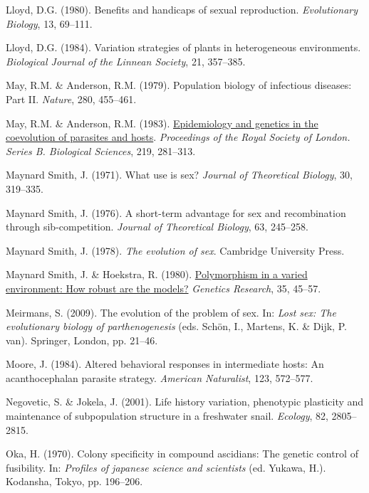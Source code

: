 \documentclass[
  letterpaper,
]{book}
\newlength{\cslhangindent}
\newenvironment{CSLReferences}[2] %
 {\begin{list}{}{%
  \setlength{\itemindent}{0pt}
  \setlength{\leftmargin}{0pt}
  \setlength{\parsep}{0pt}
  \ifodd #1
   \setlength{\leftmargin}{\cslhangindent}
   \setlength{\itemindent}{-1\cslhangindent}
  \fi
  \setlength{\itemsep}{#2\baselineskip}}}
 {\end{list}}
\begin{document}
\begin{CSLReferences}{1}{0}
Lloyd, D.G. (1980). Benefits and handicaps of sexual reproduction.
\emph{Evolutionary Biology}, 13, 69--111.

Lloyd, D.G. (1984). Variation strategies of plants in heterogeneous
environments. \emph{Biological Journal of the Linnean Society}, 21,
357--385.

May, R.M. \& Anderson, R.M. (1979). Population biology of infectious
diseases: Part II. \emph{Nature}, 280, 455--461.

May, R.M. \& Anderson, R.M. (1983).
\href{https://doi.org/10.1098/rspb.1983.0075}{Epidemiology and genetics
in the coevolution of parasites and hosts}. \emph{Proceedings of the
Royal Society of London. Series B. Biological Sciences}, 219, 281--313.

Maynard Smith, J. (1971). What use is sex? \emph{Journal of Theoretical
Biology}, 30, 319--335.

Maynard Smith, J. (1976). A short-term advantage for sex and
recombination through sib-competition. \emph{Journal of Theoretical
Biology}, 63, 245--258.

Maynard Smith, J. (1978). \emph{The evolution of sex}. Cambridge
University Press.

Maynard Smith, J. \& Hoekstra, R. (1980).
\href{https://doi.org/10.1017/S0016672300013926}{Polymorphism in a
varied environment: How robust are the models?} \emph{Genetics
Research}, 35, 45--57.

Meirmans, S. (2009). The evolution of the problem of sex. In: \emph{Lost
sex: The evolutionary biology of parthenogenesis} (eds. Schön, I.,
Martens, K. \& Dijk, P. van). Springer, London, pp. 21--46.

Moore, J. (1984). Altered behavioral responses in intermediate hosts: An
acanthocephalan parasite strategy. \emph{American Naturalist}, 123,
572--577.

Negovetic, S. \& Jokela, J. (2001). Life history variation, phenotypic
plasticity and maintenance of subpopulation structure in a freshwater
snail. \emph{Ecology}, 82, 2805--2815.

Oka, H. (1970). Colony specificity in compound ascidians: The genetic
control of fusibility. In: \emph{Profiles of japanese science and
scientists} (ed. Yukawa, H.). Kodansha, Tokyo, pp. 196--206.


\end{CSLReferences}
\end{document}
